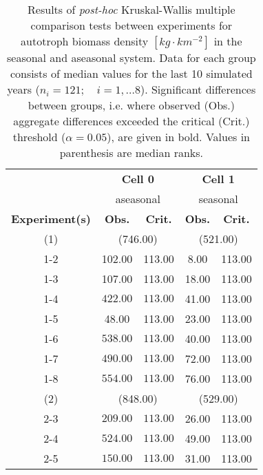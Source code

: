 \begin{table}[ht]
\centering
\small
\caption[Kruskal-Wallis multiple comparison of autotroph biomass density.]{Results of \textit{post-hoc} Kruskal-Wallis multiple comparison
                tests between experiments for autotroph biomass density $[kg\cdot km^{-2}]$ in the seasonal and aseasonal system. 
                  Data for each group consists of median values for the last 10 simulated years ($n_{i} = 121; \quad i = 1,\ldots8$). 
                  Significant differences between groups, i.e. where observed (Obs.) aggregate differences exceeded the critical (Crit.) threshold ($\alpha = 0.05$), are given in bold. Values in parenthesis are median ranks.} 
\label{tab:chap:res:dyn:autoBMD}
\begin{tabular*}{\textwidth}{@{\extracolsep{\fill} }ccccc}
  \toprule
& \multicolumn{2}{c}{\textbf{Cell 0}} & \multicolumn{2}{c}{\textbf{Cell 1}} \\
& \multicolumn{2}{c}{aseasonal} & \multicolumn{2}{c}{seasonal} \\
\cmidrule(lr){2-3} \cmidrule(lr){4-5}
\textbf{Experiment(s)} & \textbf{Obs.} & \textbf{Crit.} & \textbf{Obs.} & \textbf{Crit.} \\ 
  \midrule
  (1) & \multicolumn{2}{c}{(746.00)} & \multicolumn{2}{c}{(521.00)} \\ 
1-2 & 102.00 & 113.00 & 8.00 & 113.00 \\ 
  1-3 & 107.00 & 113.00 & 18.00 & 113.00 \\ 
  1-4 & \(\mathbf{422.00}\) & \(\mathbf{113.00}\) & 41.00 & 113.00 \\ 
  1-5 & 48.00 & 113.00 & 23.00 & 113.00 \\ 
  1-6 & \(\mathbf{538.00}\) & \(\mathbf{113.00}\) & 40.00 & 113.00 \\ 
  1-7 & \(\mathbf{490.00}\) & \(\mathbf{113.00}\) & 72.00 & 113.00 \\ 
  1-8 & \(\mathbf{554.00}\) & \(\mathbf{113.00}\) & 76.00 & 113.00 \\ [1ex]
  (2) & \multicolumn{2}{c}{(848.00)} & \multicolumn{2}{c}{(529.00)} \\
   2-3 & \(\mathbf{209.00}\) & \(\mathbf{113.00}\) & 26.00 & 113.00 \\ 
  2-4 & \(\mathbf{524.00}\) & \(\mathbf{113.00}\) & 49.00 & 113.00 \\ 
  2-5 & \(\mathbf{150.00}\) & \(\mathbf{113.00}\) & 31.00 & 113.00 \\ 

\end{tabular*}
\end{table}
